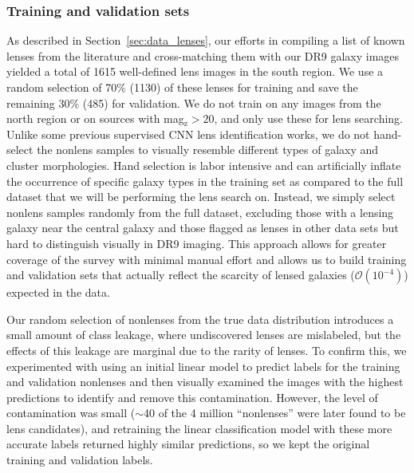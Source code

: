 \documentclass{aastex631}
\newcommand{\zmag}{mag$_{\mathrm{z}}$}
\begin{document}
\subsubsection{Training and validation sets}
\label{sec:train_val_sets}
As described in Section~\ref{sec:data_lenses}, our efforts in compiling a list of known lenses from the literature and cross-matching them with our DR9 galaxy images yielded a total of 1615 well-defined lens images in the south region. We use a random selection of 70$\%$ (1130) of these lenses for training and save the remaining 30$\%$ (485) for validation. We do not train on any images from the north region or on sources with \zmag $> 20$, and only use these for lens searching. Unlike some previous supervised CNN lens identification works, we do not hand-select the nonlens samples to visually resemble different types of galaxy and cluster morphologies. Hand selection is labor intensive and can artificially inflate the occurrence of specific galaxy types in the training set as compared to the full dataset that we will be performing the lens search on. Instead, we simply select nonlens samples randomly from the full dataset, excluding those with a lensing galaxy near the central galaxy and those flagged as lenses in other data sets but hard to distinguish visually in DR9 imaging. This approach allows for greater coverage of the survey with minimal manual effort and allows us to build training and validation sets that actually reflect the scarcity of lensed galaxies ($\mathcal{O}(10^{-4})$) expected in the data. 

Our random selection of nonlenses from the true data distribution introduces a small amount of class leakage, where undiscovered lenses are mislabeled, but the effects of this leakage are marginal due to the rarity of lenses. To confirm this, we experimented with using an initial linear model to predict labels for the training and validation nonlenses and then visually examined the images with the highest predictions to identify and remove this contamination. However, the level of contamination was small ($\sim$40 of the 4 million ``nonlenses'' were later found to be lens candidates), and retraining the linear classification model with these more accurate labels returned highly similar predictions, so we kept the original training and validation labels.
\end{document}
